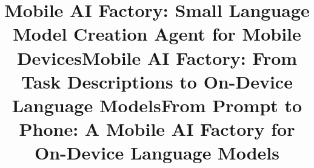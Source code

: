 \documentclass[sigconf,10pt]{acmart}
\begin{document}
\title{Mobile AI Factory: Small Language Model Creation Agent for Mobile Devices}

\title{\huge{Mobile AI Factory: From Task Descriptions to On-Device Language Models}}

\title{\huge{From Prompt to Phone: A Mobile AI  Factory for On-Device Language Models}}


\renewcommand{\shorttitle}{From Prompt to Phone: A Mobile AI  Factory for On-Device Language Models}






\maketitle







\end{document}
